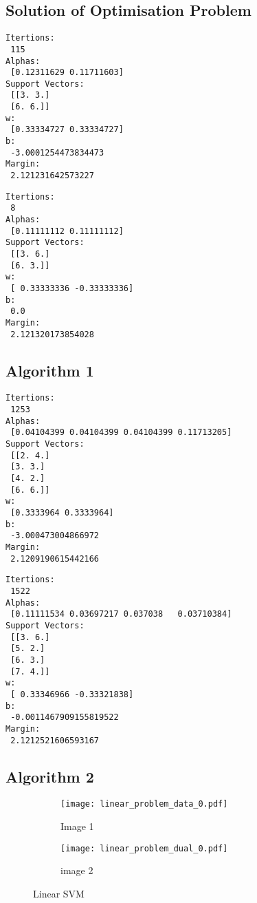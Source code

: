 \documentclass[10pt, a4paper,reqno]{amsart}
\begin{document}
\subsection{Solution of Optimisation Problem}

\begin{verbatim}
Itertions:
 115
Alphas:
 [0.12311629 0.11711603]
Support Vectors:
 [[3. 3.]
 [6. 6.]]
w:
 [0.33334727 0.33334727]
b:
 -3.0001254473834473
Margin:
 2.121231642573227
\end{verbatim}


\begin{verbatim}
Itertions:
 8
Alphas:
 [0.11111112 0.11111112]
Support Vectors:
 [[3. 6.]
 [6. 3.]]
w:
 [ 0.33333336 -0.33333336]
b:
 0.0
Margin:
 2.121320173854028
\end{verbatim}





\subsection{Algorithm 1}

\begin{verbatim}
Itertions:
 1253
Alphas:
 [0.04104399 0.04104399 0.04104399 0.11713205]
Support Vectors:
 [[2. 4.]
 [3. 3.]
 [4. 2.]
 [6. 6.]]
w:
 [0.3333964 0.3333964]
b:
 -3.000473004866972
Margin:
 2.1209190615442166
\end{verbatim}


\begin{verbatim}
Itertions:
 1522
Alphas:
 [0.11111534 0.03697217 0.037038   0.03710384]
Support Vectors:
 [[3. 6.]
 [5. 2.]
 [6. 3.]
 [7. 4.]]
w:
 [ 0.33346966 -0.33321838]
b:
 -0.0011467909155819522
Margin:
 2.1212521606593167
\end{verbatim}

\subsection{Algorithm 2}


\begin{figure}[H]
	\centering	
	\begin{subfigure}{1.0\textwidth}
		\centering
		\texttt{[image: linear\_problem\_data\_0.pdf]}
		\caption{Image 1}
	\end{subfigure}
	\begin{subfigure}{1.0\textwidth}
		\centering
		\texttt{[image: linear\_problem\_dual\_0.pdf]}
		\caption{image 2}
	\end{subfigure}
	\caption{Linear SVM}
\end{figure}
\end{document}
